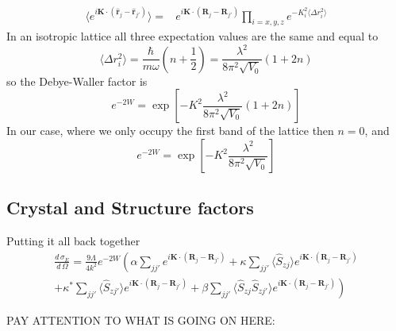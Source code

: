 \documentclass[11pt,letter]{article}
\newcommand{\bv}[1]{\ensuremath{\bm{#1}}}
\newcommand{\dsig}[1]{\ensuremath{ \frac{ d\,\sigma_{#1} }{d\,\Omega} }}
\begin{document}
\begin{equation}
\begin{split} 
\langle e^{ i \bv{K} \cdot (  \hat{\bv{r}}_{j} - \hat{\bv{r}}_{j'} )  } \rangle  
 = &  
 e^{i \bv{K} \cdot ( \bv{R}_{j} - \bv{R}_{j'} ) }
 \prod_{i=x,y,z}  e^{ - K_{i}^{2} \langle \Delta r_{i}^{2} \rangle  } 
\end{split}
\end{equation}
In an isotropic lattice all three expectation values are the same and equal to  
\begin{equation}
\langle \Delta r_{i}^{2} \rangle = \frac{\hbar}{m\omega}\left(n+\frac{1}{2}  \right) = \frac{\lambda^{2}}{8 \pi^{2}\sqrt{V_{0}}} ( 1 + 2n) 
\end{equation}
so the Debye-Waller factor is 
\begin{equation}
e^{-2W} = \exp\left[-K^{2} \frac{\lambda^{2}}{8\pi^{2} \sqrt{V_{0}}} ( 1+2n) \right]
\end{equation}
In our case, where we only occupy the first band of the lattice then $n=0$, and  
\begin{equation}
e^{-2W} = \exp\left[-K^{2} \frac{\lambda^{2}}{8\pi^{2} \sqrt{V_{0}}} \right]
\end{equation}

\subsection{Crystal and Structure factors }

Putting it all back together 
\begin{multline}
\dsig{E} =  \frac{9\Lambda}{4k^{2}} e^{-2W} \left(
               \alpha \sum_{ j j' }      e^{i\bv{K}\cdot(\bv{R}_{j}-\bv{R}_{j'})}
            +  \kappa \sum_{ j j' } \langle \hat{S}_{zj} \rangle e^{i\bv{K}\cdot(\bv{R}_{j}-\bv{R}_{j'})} \right. \\
  \left.    +  \kappa^{*} \sum_{ j j' } \langle \hat{S}_{zj'} \rangle e^{i\bv{K}\cdot(\bv{R}_{j}-\bv{R}_{j'})}
            +  \beta \sum_{j j'} \langle \hat{S}_{zj} \hat{S}_{zj'} \rangle e^{i\bv{K}\cdot(\bv{R}_{j}-\bv{R}_{j'})}  \right) 
\end{multline}

PAY ATTENTION TO WHAT IS GOING ON HERE:
\end{document}
